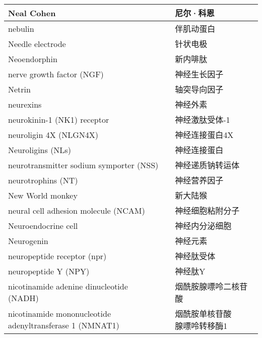\begin{longtable}{lll}
	\midrule
	Neal Cohen   &&  尼尔·科恩 \\
	
	\midrule
	nebulin   &&  伴肌动蛋白 \\
	
	\midrule
	Needle electrode   &&  针状电极 \\
	
	\midrule
	Neoendorphin   &&  新内啡肽 \\
	
	\midrule
	nerve growth factor (NGF)   &&  神经生长因子 \\
	
	\midrule
	Netrin   &&  轴突导向因子 \\
	
	\midrule
	neurexins   &&  神经外素 \\
	
	\midrule
	neurokinin-1 (NK1) receptor   && 神经激肽受体-1 \\
	
	\midrule
	neuroligin 4X (NLGN4X)  && 神经连接蛋白4X \\
	
	\midrule
	Neuroligins (NLs)   && 神经连接蛋白 \\
	
	\midrule
	neurotransmitter sodium symporter (NSS)  && 神经递质钠转运体 \\
	
	\midrule
	neurotrophins (NT)   && 神经营养因子 \\
	
	\midrule
	New World monkey   && 新大陆猴 \\
	
	\midrule
	neural cell adhesion molecule (NCAM)  && 神经细胞粘附分子 \\
	
	\midrule
	Neuroendocrine cell   && 神经内分泌细胞 \\
	
	\midrule
	Neurogenin   && 神经元素 \\
	
	\midrule
	neuropeptide receptor (npr)   && 神经肽受体 \\
	
	\midrule
	neuropeptide Y (NPY)  && 神经肽Y \\
	
	\midrule
	nicotinamide adenine dinucleotide (NADH)  && 烟酰胺腺嘌呤二核苷酸 \\
	
	\midrule
	\makecell[l]{nicotinamide mononucleotide \\ adenyltransferase 1 (NMNAT1)}  && \makecell{烟酰胺单核苷酸\\腺嘌呤转移酶1} \\
	

\end{longtable}
